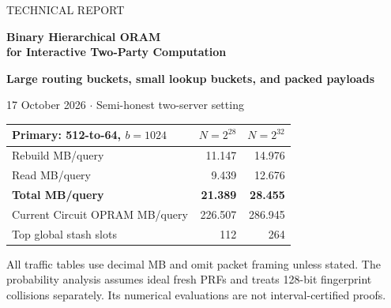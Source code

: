 \documentclass[11pt]{article}
\begin{document}
{\color{teal}\large TECHNICAL REPORT\par}
{\color{navy}\LARGE\bfseries Binary Hierarchical ORAM\\for Interactive Two-Party Computation\par}
\vspace{5pt}
\textbf{Large routing buckets, small lookup buckets, and packed payloads}\par
17 October 2026 \quad $\cdot$ \quad Semi-honest two-server setting
\vspace{6pt}

\begin{abstract}
We adapt the hierarchical design of Microrama to streamed, interactive
two-party computation. A read invalidates its old copy and reinserts one
batch representative, eliminating key deduplication during rebuilding.
The hierarchy is binary, its base is a hash table, and no recursive position
map or deamortized schedule is required. Secret PRFs compress application
keys to 128 bits and generate all table addresses.

Rebuilding first routes records through 512-slot buckets, then refines each
bucket into 64- or 128-slot lookup buckets using recursive ORCompact.
A metadata-only planner identifies exact final-bucket excess before entries
move. One 64-slot residual buffer per parent collects this excess; a further
ORCompact merges all parent buffers into a fixed table stash. Every read
searches its selected small bucket and that stash. We include the cost of
re-admitting the stash at the next rebuild.

With a batch of 1024, 64-slot lookup buckets use approximately 21.4 and
28.5 MB per lookup at $N=2^{28}$ and $2^{32}$, including rebuilding, reads,
initial PRF evaluation, duplicate handling, and packed-payload movement.
Rebuilding accounts for about 11.1 and 15.0 MB and is now the larger component.
The current Circuit OPRAM planning ledger uses 226.5 and 286.9 MB.
These are communication estimates for specified kernels, not measured
throughput. Payloads use a concrete XOR-share/word-OT backend; base-OT setup,
CPU, initialization, replication, and implementation validation remain separate.
\end{abstract}
\begin{center}\small
\begin{tabular}{lrr}\toprule
Primary: 512-to-64, $b=1024$ & $N=2^{28}$ & $N=2^{32}$\\\midrule
Rebuild MB/query & 11.147 & 14.976\\
Read MB/query & 9.439 & 12.676\\
\textbf{Total MB/query} & \textbf{21.389} & \textbf{28.455}\\
Current Circuit OPRAM MB/query & 226.507 & 286.945\\
Top global stash slots & 112 & 264\\
\bottomrule\end{tabular}\end{center}
All traffic tables use decimal MB and omit packet framing unless stated.
The probability analysis assumes ideal fresh PRFs and treats 128-bit
fingerprint collisions separately. Its numerical evaluations are not
interval-certified proofs.
\end{document}
